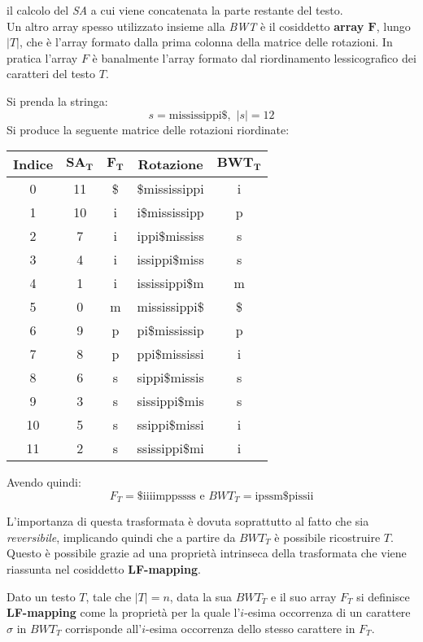 il calcolo del \textit{SA} a cui viene concatenata la parte restante del
testo.\\
Un altro array spesso utilizzato insieme alla \textit{BWT} è il cosiddetto
\textbf{array $\mathbf{F}$}, lungo $|T|$, che è l'array formato
dalla prima colonna della matrice delle rotazioni. In pratica l'array $F$ è
banalmente l'array formato dal riordinamento 
lessicografico dei caratteri del testo $T$.\\
\begin{esempio}
  Si prenda la stringa:
  \[s=\mbox{mississippi\$},\,\,|s|=12\]
  Si produce la seguente matrice delle rotazioni riordinate:
  \begin{table}[H]
    \centering
    \footnotesize
    \begin{tabular}{c|c|c|c|c} 
      \textbf{Indice} & $\mathbf{SA_T}$ & $\mathbf{F_T}$ & \textbf{Rotazione}
      & $\mathbf{BWT_T}$\\ 
      \hline
      0 & 11 & \$ & \$mississippi & i\\
      1 & 10 & i & i\$mississipp & p\\
      2 & 7 & i & ippi\$mississ & s\\
      3 & 4 & i & issippi\$miss & s\\
      4 & 1 & i & ississippi\$m & m\\
      5 & 0 & m & mississippi\$ & \$\\
      6 & 9 & p & pi\$mississip & p\\
      7 & 8 & p & ppi\$mississi & i\\
      8 & 6 & s & sippi\$missis & s\\
      9 & 3 & s & sissippi\$mis & s\\
      10 & 5 & s & ssippi\$missi & i\\
      11 & 2 & s & ssissippi\$mi & i\\
    \end{tabular}
  \end{table}
  Avendo quindi:
  \[F_T=\mbox{\$iiiimppssss}\mbox{ e }BWT_T=\mbox{ipssm\$pissii}\]
\end{esempio}
L'importanza di questa trasformata è dovuta soprattutto al fatto che sia
\textit{reversibile}, implicando quindi che a partire da $BWT_T$ è possibile
ricostruire $T$. Questo è possibile grazie ad una proprietà intrinseca della
trasformata che viene riassunta nel cosiddetto \textbf{LF-mapping}.
\begin{definizione}
  Dato un testo $T$, tale che $|T|=n$, data la sua $BWT_T$ e il suo array $F_T$
  si definisce \textbf{LF-mapping} come la proprietà per la quale l'$i$-esima
  occorrenza di un carattere $\sigma$ in $BWT_T$ corrisponde all'$i$-esima
  occorrenza dello stesso carattere in $F_T$.
\end{definizione}
